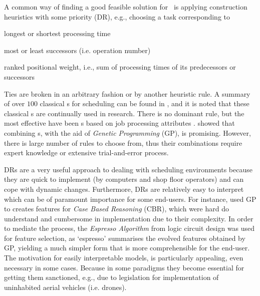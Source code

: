 A common way of finding a good feasible solution for \JSP\ is 
applying construction heuristics with some priority \emph{\dr} (DR), e.g., 
choosing a task corresponding to
\begin{enumerate*}[itemjoin*={{, or }}]
  \item longest or shortest processing time
  \item most or least successors (i.e. operation number)
  \item ranked positional weight, i.e., sum of processing times of its 
  predecessors or successors
\end{enumerate*} 
Ties are broken in an arbitrary fashion or by another heuristic rule.
A summary of over $100$ classical \dr s for scheduling can be found in 
\citet{Panwalkar77}, and it is noted that these classical \dr s are continually 
used in research.  
There is no dominant rule, but the most effective have been \sdr s based on job 
processing attributes \citep{Haupt89}. \citet{Tay08} showed that combining \dr 
s, with the aid of \emph{Genetic Programming} (GP), is promising. However, 
there is large number of rules to choose from, thus their combinations require 
expert knowledge or extensive trial-and-error process.

DRs are a very useful approach to dealing with scheduling 
environments because they are quick to implement (by computers and shop floor 
operators) and can cope with dynamic changes. 
Furthermore, DRs are relatively easy to interpret which can be of paramount 
importance for some end-users.
For instance, \citet{Keane15} used GP to creates features 
for \emph{Case Based Reasoning} (CBR), which were hard do understand and 
cumbersome in 
implementation due to their complexity. In order to mediate the process, the 
\emph{Espresso Algorithm}  from logic circuit design was used for feature 
selection,  as `espresso' summarises the evolved features obtained by GP, 
yielding a much simpler form that is more comprehensible for the end-user.
The motivation for easily interpretable models, is particularly appealing, 
even necessary in some cases. Because in some paradigms they become 
essential for getting them sanctioned, e.g., due to legislation for 
implementation of uninhabited aerial vehicles (i.e. drones).

